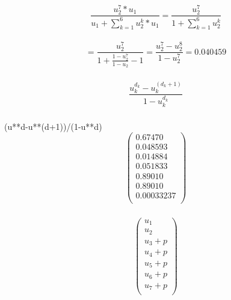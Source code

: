 \documentclass{article}
\begin{document}
\subsubsection{}
\Large {
$$\frac{u_2^7 * u_1}{u_1 + \sum_{k=1}^{6} u_2^k * u_1} 
= \frac{u_2^7}{1 + \sum_{k=1}^{6} u_2^k}$$ \\
$$= \frac{u_2^7}{1 + \frac{1 - u_2^7}{1 - u_2}-1} =
 \frac{u_2^7 - u_2^8}{1-u_2^7} = 0.040459$$
}

\subsubsection{}
\Large {
$$\frac{u_k^{d_k} - u_k^{(d_k+1)}}{1-u_k^{d_k}}$$
}

\subsubsection{}
(u**d-u**(d+1))/(1-u**d)
\[
    \begin{pmatrix}
     0.67470 \\
     0.048593 \\
     0.014884  \\
     0.051833 \\
     0.89010 \\
     0.89010 \\
     0.00033237 \\
    \end{pmatrix}
\]

\subsubsection{}

\subsubsection{}
\[
    \begin{pmatrix}
     u_1 \\
     u_2 \\
     u_3 + p  \\
     u_4 + p \\
     u_5 + p \\
     u_6 + p \\
     u_7 + p \\
    \end{pmatrix}
\]



\subsection{}
\end{document}
